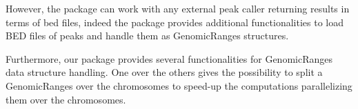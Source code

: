 However, the package can work with any external peak caller returning results in terms of bed files, indeed the package provides additional functionalities to load BED files of peaks and handle them as GenomicRanges \cite{Lawrence2013} structures.

Furthermore, our package provides several functionalities for GenomicRanges data structure
handling. One over the others gives the possibility to split a GenomicRanges over the chromosomes
to speed-up the computations parallelizing them over the chromosomes.